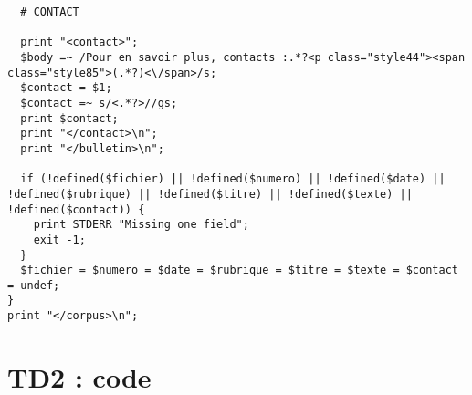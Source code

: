 \begin{lstlisting}
  # CONTACT

  print "<contact>";
  $body =~ /Pour en savoir plus, contacts :.*?<p class="style44"><span class="style85">(.*?)<\/span>/s;
  $contact = $1;
  $contact =~ s/<.*?>//gs;
  print $contact;
  print "</contact>\n";
  print "</bulletin>\n";

  if (!defined($fichier) || !defined($numero) || !defined($date) || !defined($rubrique) || !defined($titre) || !defined($texte) || !defined($contact)) {
    print STDERR "Missing one field";
    exit -1;
  }
  $fichier = $numero = $date = $rubrique = $titre = $texte = $contact = undef;
}
print "</corpus>\n";
\end{lstlisting}

\chapter{TD2 : code}


